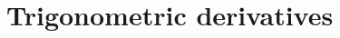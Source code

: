 \documentclass[../book/calcnotes.tex]{subfiles}
\begin{document}
\section{Trigonometric derivatives}
\label{sec:derivs.trig}

\begin{exercises}
\end{exercises}
\end{document}
